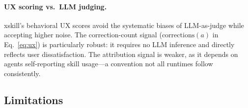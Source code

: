 \documentclass{article}
\begin{document}
\paragraph{UX scoring vs.\ LLM judging.} xskill's behavioral UX scores avoid the systematic biases of LLM-as-judge while accepting higher noise. The correction-count signal ($\mathrm{corrections}(a)$ in Eq.~\ref{eq:ux}) is particularly robust: it requires no LLM inference and directly reflects user dissatisfaction. The attribution signal is weaker, as it depends on agents self-reporting skill usage---a convention not all runtimes follow consistently.

\subsection{Limitations}
\end{document}
